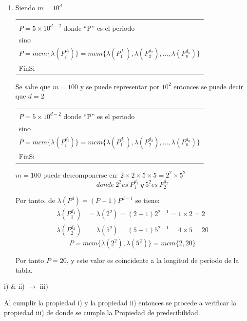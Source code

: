 \documentclass[11pt,letterpaper]{report}
\newenvironment{algoritmo}
  {\begin{center}\begin{tabular}{|p{0.85\textwidth}|}\hline\vspace{-0.2cm}\begin{tabbing}\hspace{0.6cm}\=\hspace{0.6cm}\=\hspace{0.6cm}\=\hspace{0.6cm}\=\hspace{0.6cm}\=\kill}
  {\end{tabbing}\vspace{-0.4cm}\\\hline\end{tabular}\end{center}}
\begin{document}
\begin{enumerate}[label=\roman*)]
\begin{center}
\end{center}

\item Siendo $m = 10^d$

\begin{algoritmo}
\>Si $d \geq 5$ entonces\\
\>\>$P = 5 \times 10^{d-2}$ donde ``P'' es el periodo\\
\>sino\\
\>\>$P = mcm\{\lambda(P_i^{d_i})\} = mcm\{\lambda(P_1^{d_1}), \lambda(P_2^{d_2}), \ldots, \lambda(P_n^{d_n})\}$\\
\>FinSi
\end{algoritmo}

Se sabe que $m = 100$ y se puede representar por $10^2$ entonces se puede decir que $d = 2$

\begin{algoritmo}
\>Si $2 \geq 5$ entonces\\
\>\>$P = 5 \times 10^{d-2}$ donde ``P'' es el periodo\\
\>sino\\
\>\>$P = mcm\{\lambda(P_i^{d_i})\} = mcm\{\lambda(P_1^{d_1}), \lambda(P_2^{d_2}), \ldots, \lambda(P_n^{d_n})\}$\\
\>FinSi
\end{algoritmo}

$m = 100$ puede descomponerse en: $2 \times 2 \times 5 \times 5 = 2^2 \times 5^2$
\[
donde\ 2^2 es\ P_1^{d_1}\ y\ 5^2 es\ P_2^{d_2}
\]

Por tanto, de $\lambda(P^d) = (P-1)P^{d-1}$ se tiene:
\begin{align*}
\lambda(P_1^{d_1}) &= \lambda(2^2) = (2-1)2^{2-1} = 1 \times 2 = 2\\
\lambda(P_2^{d_2}) &= \lambda(5^2) = (5-1)5^{2-1} = 4 \times 5 = 20
\end{align*}
\[
P = mcm\{\lambda(2^2), \lambda(5^2)\} = mcm\{2, 20\}
\]

Por tanto $P = 20$, y este valor es coincidente a la longitud de periodo de la tabla.
\end{enumerate}

\begin{center}
i) \& ii) $\rightarrow$ iii)
\end{center}

Al cumplir la propiedad i) y la propiedad ii) entonces se procede a verificar la propiedad iii) de donde se cumple la Propiedad de predecibilidad.
\end{document}
